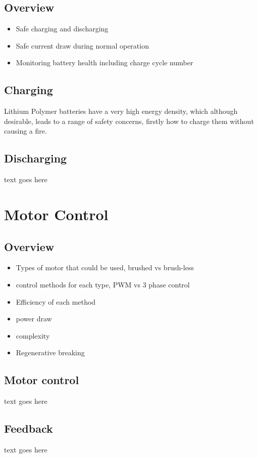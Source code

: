 \documentclass[journal,10pt]{IEEEtran}
\begin{document}
	\subsection{Overview}
		\begin{itemize}
			\item Safe charging and discharging 
			\item Safe current draw during normal operation
			\item Monitoring battery health including charge cycle number
		\end{itemize}
	\subsection{Charging}
		Lithium Polymer batteries have a very high energy density, which although desirable, leads to a range of safety concerns, firstly how to charge them without causing a fire.
	\subsection{Discharging}
		text goes here
\section{Motor Control}
	\subsection{Overview}
		\begin{itemize}
			\item Types of motor that could be used, brushed vs brush-less
			\item control methods for each type, PWM vs 3 phase control
			\item Efficiency of each method
			\item power draw
			\item complexity
			\item Regenerative breaking
		\end{itemize}
	\subsection{Motor control}
		text goes here
	\subsection{Feedback}
		text goes here
\end{document}
